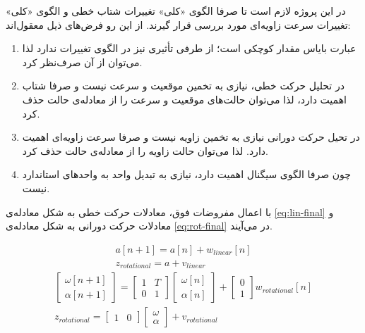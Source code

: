 در این پروژه لازم است تا صرفا الگوی «کلی» تغییرات شتاب خطی و الگوی «کلی» تغییرات سرعت زاویه‌ای مورد بررسی قرار گیرند. از این رو فرض‌های ذیل معقول‌اند:
\begin{enumerate}
	\item عبارت بایاس مقدار کوچکی است؛ از طرفی تأثیری نیز در الگوی تغییرات ندارد لذا می‌توان از آن صرف‌نظر کرد.
	\item در تحلیل حرکت خطی، نیازی به تخمین موقعیت و سرعت نیست و صرفا شتاب اهمیت دارد، لذا می‌توان حالت‌های موقعیت و سرعت را از معادله‌ی حالت حذف کرد.
	\item در تحیل حرکت دورانی نیازی به تخمین زاویه نیست و صرفا سرعت زاویه‌ای اهمیت دارد. لذا می‌توان حالت زاویه را از معادله‌ی حالت حذف کرد.
	\item چون  صرفا الگوی سیگنال اهمیت دارد، نیازی به تبدیل واحد به واحدهای استاندارد نیست.
\end{enumerate}

\newpage
با اعمال مفروضات فوق، معادلات حرکت خطی به شکل معادله‌ی \ref{eq:lin-final} و معادلات حرکت دورانی به شکل معادله‌ی \ref{eq:rot-final} در می‌آیند.

\begin{gather}
	a[n+1] = a[n] + w_{linear}[n] \nonumber
	\\
	z_{rotational} = a + v_{linear} 
	\label{eq:lin-final}
\end{gather}
\begin{gather}
	\begin{bmatrix}
		\omega[n+1] \\
		\alpha[n+1] 
	\end{bmatrix}
	=
	\begin{bmatrix}
		1 & T \\
		0 & 1
	\end{bmatrix}
	\begin{bmatrix}
		\omega[n] \\
		\alpha[n]
	\end{bmatrix}
	+
	\begin{bmatrix}
		0 \\
		1
	\end{bmatrix}
	w_{rotational}[n] \nonumber
	\\
	z_{rotational} = 
	\begin{bmatrix}
		1 & 0
	\end{bmatrix}
	\begin{bmatrix}
		\omega \\
		\alpha
	\end{bmatrix}
	+ v_{rotational} 
	\label{eq:rot-final}
\end{gather}

